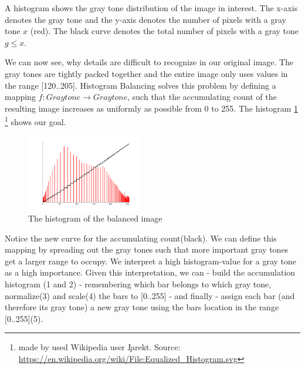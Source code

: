       A histogram shows the gray tone distribution of the image in interest.
      The x-axis denotes the gray tone and the y-axis denotes the
      number of pixels with a gray tone $x$ (red). The black curve denotes the
      total number of pixels with a gray tone $g \leq x$.

      We can now see, why details are difficult to recognize in our original image.
      The gray tones are tightly packed together and the
      entire image only uses values in the range [120..205].
      Histogram Balancing solves this problem by defining a mapping
      $f: Graytone \rightarrow Graytone$, such that the accumulating count
      of the resulting image increases as uniformly as possible from 0 to 255.
      The histogram \ref{fig:hist-eq}
      \footnote{made by used Wikipedia user \c{Jarekt}. Source: \url{https://en.wikipedia.org/wiki/File:Equalized_Histogram.svg}}
      shows our goal.
      
      \begin{figure}[h]
        \centering
        \includegraphics[width=0.45\textwidth]{hist-eq}
        \caption{The histogram of the balanced image}
        \label{fig:hist-eq}
      \end{figure}
      
      Notice the new curve for the accumulating count(black). We can define
      this mapping by spreading out the gray tones such that more
      important gray tones get a larger range to occupy. We interpret
      a high histogram-value for a gray tone as a high importance.
      Given this interpretation, we can - build the accumulation histogram (1 and 2) - remembering which
      bar belongs to which gray tone, normalize(3) and scale(4) the bars to [0..255] - 
      and finally - assign each bar (and therefore its gray tone) a new gray tone
      using the bars location in the range [0..255](5).
      
